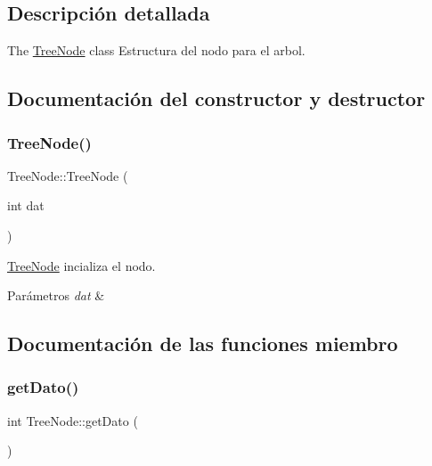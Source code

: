\subsection{Descripción detallada}
The \mbox{\hyperlink{class_tree_node}{Tree\+Node}} class Estructura del nodo para el arbol. 

\subsection{Documentación del constructor y destructor}
\mbox{\label{class_tree_node_a736fc461fefd4f39a0f9e826fe635bf9}} 
\subsubsection{\texorpdfstring{Tree\+Node()}{TreeNode()}}
{\footnotesize\ttfamily Tree\+Node\+::\+Tree\+Node (\begin{DoxyParamCaption}\item[{int}]{dat }\end{DoxyParamCaption})\hspace{0.3cm}{\ttfamily [inline]}}



\mbox{\hyperlink{class_tree_node}{Tree\+Node}} incializa el nodo. 


\begin{DoxyParams}{Parámetros}
{\em dat} & \\
\hline
\end{DoxyParams}


\subsection{Documentación de las funciones miembro}
\mbox{\label{class_tree_node_af6a61a7d6b4769811dc7c0a8d5a8312d}} 
\subsubsection{\texorpdfstring{get\+Dato()}{getDato()}}
{\footnotesize\ttfamily int Tree\+Node\+::get\+Dato (\begin{DoxyParamCaption}{ }\end{DoxyParamCaption})\hspace{0.3cm}{\ttfamily [inline]}}



